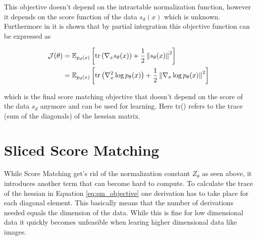 This objective doesn't depend on the intractable normalization function, however it depends on the score function of the data 
$s_d(x)$ which is unknown. Furthermore in \cite{sm} it is shown that by partial integration this objective function can be expressed as 

\begin{align}
    \label{eq:sm_objective}
    \mathcal{J}(\theta) & = \mathbb{E}_{p_d(x)} \left[\text{tr} \left( \nabla_x s_\theta(x) \right) + \frac{1}{2} \left\| s_\theta(x) \right\|^2 \right] \notag \\ 
    & = \mathbb{E}_{p_d(x)} \left[\text{tr} \left( \nabla_x^2 \log p_\theta(x) \right) + \frac{1}{2} \left\| \nabla_x \log p_\theta(x) \right\|^2 \right]
\end{align}

which is the final score matching objective that doesn't depend on the score of the data $s_d$ anymore and can be used for learning. Here tr() refers to the
trace (sum of the diagonals) of the hessian matrix.

\section{Sliced Score Matching}
\label{sec:ssm}

While Score Matching get's rid of the normalization constant $Z_\theta$ as seen above, it introduces another term that can become hard
to compute. To calculate the trace of the hessian in Equation \ref{eq:sm_objective} one derivation has to take place for each diagonal element.
This basically means that the number of derivations needed equals the dimension of the data. 
While this is fine for low dimensional data it quickly becomes unfeasible when
learing higher dimensional data like images.  








